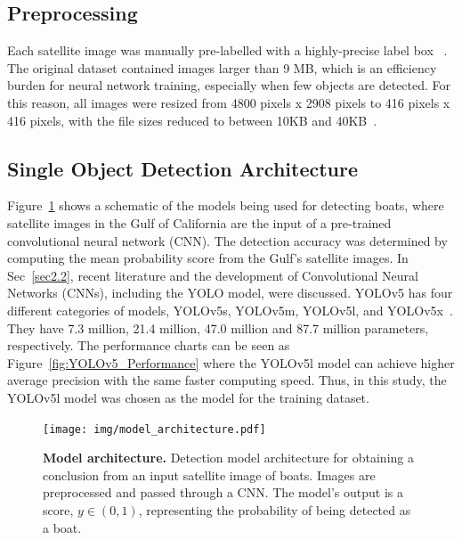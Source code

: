 \subsection{Preprocessing}
Each satellite image was manually pre-labelled with a highly-precise label box ~\cite{lutherborrowship}. The original dataset contained images larger than 9 MB, which is an efficiency burden for neural network training, especially when few objects are detected. For this reason, all images were resized from 4800 pixels x 2908 pixels to 416 pixels x 416 pixels, with the file sizes reduced to between 10KB and 40KB~\cite{nelson_2020}. 


\subsection{Single Object Detection Architecture}
\label{III-D-Detection-Architecture}

Figure~\ref{model_architecture} shows a schematic of the models being used for detecting boats, where satellite images in the Gulf of California are the input of a pre-trained convolutional neural network (CNN). The detection accuracy was determined by computing the mean probability score from the Gulf's satellite images. In Sec~\ref{sec2.2}, recent literature and the development of Convolutional Neural Networks (CNNs), including the YOLO model, were discussed. YOLOv5 has four different categories of models, YOLOv5s, YOLOv5m, YOLOv5l, and YOLOv5x~\cite{glenn_jocher_2022_6222936}. They have 7.3 million, 21.4 million, 47.0 million and 87.7 million parameters, respectively. The performance charts can be seen as Figure~\ref{fig:YOLOv5_Performance} where the YOLOv5l model can achieve higher average precision with the same faster computing speed. Thus, in this study, the YOLOv5l model was chosen as the model for the training dataset.

\begin{figure}[!t]
    \centering
    \texttt{[image: img/model\_architecture.pdf]}
    \caption{\textbf{Model architecture.} Detection model architecture for obtaining a conclusion from an input satellite image of boats.  Images are preprocessed and passed through a CNN. The model's output is a score, $y \in (0,1)$, representing the probability of being detected as a boat.}
    \label{model_architecture}
\end{figure}

